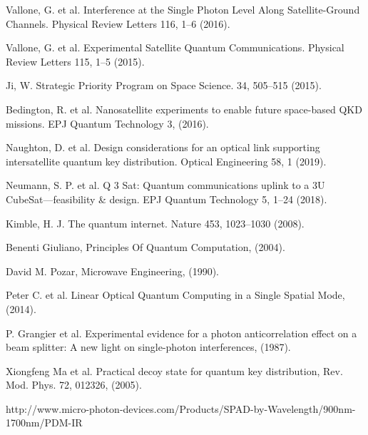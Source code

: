 \begin{thebibliography}{99}
  Vallone,
  G. et al. Interference at the Single Photon Level Along Satellite-Ground Channels. Physical Review Letters 116,
  1–6 (2016).

  Vallone,
  G. et al. Experimental Satellite Quantum Communications. Physical Review Letters 115,
  1–5 (2015).

  Ji,
  W. Strategic Priority Program on Space Science. 34,
  505–515 (2015).

  Bedington,
  R. et al. Nanosatellite experiments to enable future space-based QKD missions. EPJ Quantum Technology 3,
  (2016).

  Naughton,
  D. et al. Design considerations for an optical link supporting intersatellite quantum key distribution. Optical Engineering 58,
  1 (2019).

  Neumann,
  S. P. et al. Q 3 Sat: Quantum communications uplink to a 3U CubeSat—feasibility \& design. EPJ Quantum Technology 5,
  1–24 (2018).

  Kimble,
  H. J. The quantum internet. Nature 453,
  1023–1030 (2008).

  Benenti Giuliano,
  Principles Of Quantum Computation,
  (2004).

  David M. Pozar,
  Microwave Engineering,
  (1990).

  Peter C. et al.
  Linear Optical Quantum Computing in a Single Spatial Mode,
  (2014).

  P. Grangier et al.
  Experimental evidence for a photon anticorrelation effect on a beam splitter: A new light on single-photon interferences,
  (1987).

  Xiongfeng Ma et al.
  Practical decoy state for quantum key distribution,
  Rev. Mod. Phys. 72, 012326,
  (2005).

  http://www.micro-photon-devices.com/Products/SPAD-by-Wavelength/900nm-1700nm/PDM-IR

\end{thebibliography}
